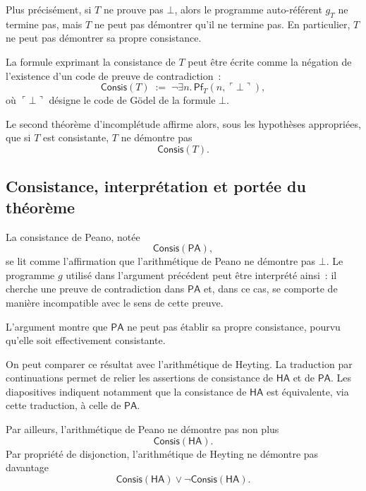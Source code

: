 Plus précisément, si $T$ ne prouve pas $\bot$, alors le programme
auto-référent $g_T$ ne termine pas, mais $T$ ne peut pas démontrer qu'il
ne termine pas.  En particulier, $T$ ne peut pas démontrer sa propre
consistance.

\thingy
La formule exprimant la consistance de $T$ peut être écrite comme la
négation de l'existence d'un code de preuve de contradiction :
\[
\mathsf{Consis}(T)
\;:=\;
\neg\exists n.\,\mathsf{Pf}_T(n,\ulcorner\bot\urcorner),
\]
où $\ulcorner\bot\urcorner$ désigne le code de Gödel de la formule
$\bot$.

Le second théorème d'incomplétude affirme alors, sous les hypothèses
appropriées, que si $T$ est consistante, $T$ ne démontre pas
\[
\mathsf{Consis}(T).
\]

\subsection{Consistance, interprétation et portée du théorème}

\thingy
La consistance de Peano, notée
\[
\mathsf{Consis}(\mathsf{PA}),
\]
se lit comme l'affirmation que l'arithmétique de Peano ne démontre pas
$\bot$.  Le programme $g$ utilisé dans l'argument précédent peut être
interprété ainsi : il cherche une preuve de contradiction dans
$\mathsf{PA}$ et, dans ce cas, se comporte de manière incompatible avec
le sens de cette preuve.

L'argument montre que $\mathsf{PA}$ ne peut pas établir sa propre
consistance, pourvu qu'elle soit effectivement consistante.

\thingy
On peut comparer ce résultat avec l'arithmétique de Heyting.  La
traduction par continuations permet de relier les assertions de
consistance de $\mathsf{HA}$ et de $\mathsf{PA}$.  Les diapositives
indiquent notamment que la consistance de $\mathsf{HA}$ est équivalente,
via cette traduction, à celle de $\mathsf{PA}$.

Par ailleurs, l'arithmétique de Peano ne démontre pas non plus
\[
\mathsf{Consis}(\mathsf{HA}).
\]
Par propriété de disjonction, l'arithmétique de Heyting ne démontre pas
davantage
\[
\mathsf{Consis}(\mathsf{HA})
\lor
\neg\mathsf{Consis}(\mathsf{HA}).
\]


